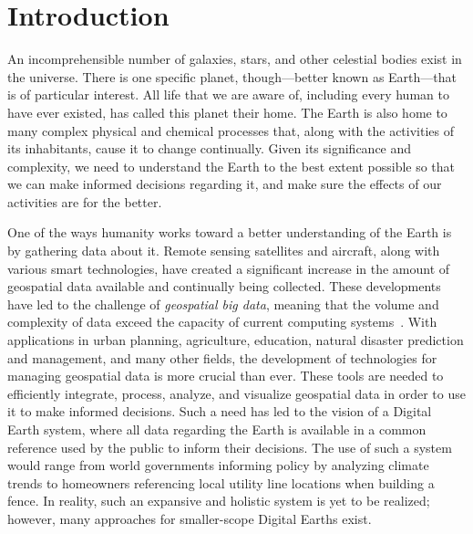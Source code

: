 \chapter{Introduction} \label{chap:introduction}
An incomprehensible number of galaxies, stars, and other celestial bodies exist in the universe.
There is one specific planet, though---better known as Earth---that is of particular interest.
All life that we are aware of, including every human to have ever existed, has called this planet their home.
The Earth is also home to many complex physical and chemical processes that, along with the activities of its inhabitants, cause it to change continually.
Given its significance and complexity, we need to understand the Earth to the best extent possible so that we can make informed decisions regarding it, and make sure the effects of our activities are for the better.


One of the ways humanity works toward a better understanding of the Earth is by gathering data about it.
Remote sensing satellites and aircraft, along with various smart technologies, have created a significant increase in the amount of geospatial data available and continually being collected.
These developments have led to the challenge of \textit{geospatial big data}, meaning that the volume and complexity of data exceed the capacity of current computing systems~\cite{lee2015geospatial}.
With applications in urban planning, agriculture, education, natural disaster prediction and management, and many other fields, the development of technologies for managing geospatial data is more crucial than ever.
These tools are needed to efficiently integrate, process, analyze, and visualize geospatial data in order to use it to make informed decisions.
Such a need has led to the vision of a Digital Earth system, where all data regarding the Earth is available in a common reference used by the public to inform their decisions.
The use of such a system would range from world governments informing policy by analyzing climate trends to homeowners referencing local utility line locations when building a fence.
In reality, such an expansive and holistic system is yet to be realized; however, many approaches for smaller-scope Digital Earths exist.


